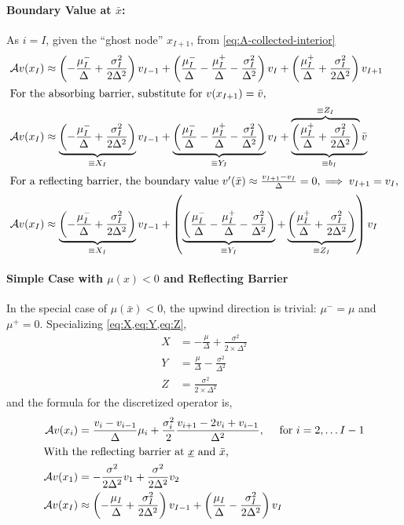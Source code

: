 \documentclass[11pt]{etk-article}
\begin{document}
\paragraph{Boundary Value at $\bar{x}$:}
As $i=I$, given the ``ghost node'' $x_{I+1}$, from \cref{eq:A-collected-interior}
\begin{align}
\mathcal{A} v(x_I)&\approx \left(-\frac{\mu_I^{-}}{\Delta} +\frac{\sigma_I^2}{2\Delta^2}\right)v_{I-1} + \left(\frac{\mu_I^{-}}{\Delta} - \frac{\mu_I^{+}}{\Delta}-\frac{\sigma_I^2}{\Delta^2}\right)v_I + \left(\frac{\mu_I^{+}}{\Delta} + \frac{\sigma_I^2}{2\Delta^2}\right)v_{I+1}\\
\intertext{For the absorbing barrier, substitute for $v(x_{I+1}) = \bar{v}$,}
\mathcal{A} v(x_I)&\approx \underbrace{\left(-\frac{\mu_I^{-}}{\Delta} +\frac{\sigma_I^2}{2\Delta^2}\right)}_{\equiv X_I} v_{I-1} + \underbrace{\left(\frac{\mu_I^{-}}{\Delta} - \frac{\mu_I^{+}}{\Delta}-\frac{\sigma_I^2}{\Delta^2}\right)}_{\equiv Y_I} v_I + \underbrace{\overbrace{\left(\frac{\mu_I^{+}}{\Delta} + \frac{\sigma_I^2}{2\Delta^2}\right)}^{\equiv Z_I}\bar{v}}_{\equiv b_I}\\
\intertext{For a reflecting barrier, the boundary value $v'(\bar{x}) \approx \frac{v_{I+1}-v_I}{\Delta} = 0, \implies v_{I+1} = v_I$,}
\mathcal{A} v(x_I)&\approx \underbrace{\left(-\frac{\mu_I^{-}}{\Delta} +\frac{\sigma_I^2}{2\Delta^2}\right)}_{\equiv X_I} v_{I-1} + \left(\underbrace{\left(\frac{\mu_I^{-}}{\Delta} - \frac{\mu_I^{+}}{\Delta}-\frac{\sigma_I^2}{\Delta^2}\right)}_{\equiv Y_I} + \underbrace{\left(\frac{\mu_I^{+}}{\Delta} + \frac{\sigma_I^2}{2\Delta^2}\right)}_{\equiv Z_I} \right) v_I 
\end{align}
\paragraph{Simple Case with $\mu(x) < 0$ and Reflecting Barrier}
In the special case of $\mu(\bar{x}) < 0$, the upwind direction is trivial: $\mu^{-} = \mu$ and $\mu^{+} = 0$.  Specializing \cref{eq:X,eq:Y,eq:Z},
\begin{align}
	X &= - \frac{\mu}{\Delta} + \frac{\sigma^{2}}{2\times \Delta^{2}}\label{eq:X-backwards} \\
	Y &= \frac{\mu}{\Delta} - \frac{\sigma^{2}}{\Delta^{2}}\label{eq:Y-backwards} \\
	Z &= \frac{\sigma^{2}}{2\times \Delta^{2}}\label{eq:Z-backwards}
\end{align}
and the formula for the discretized operator is,
\begin{align}
	\mathcal{A} v(x_i)  &= \frac{v_i-v_{i-1}}{\Delta}\mu_i + \frac{\sigma_i^2}{2} \frac{v_{i+1} - 2 v_i + v_{i-1}}{\Delta^2},\quad \text{ for } i = 2,\ldots I-1\\
	\intertext{With the reflecting barrier at $\underline{x}$ and $\bar{x}$,}
	\mathcal{A} v(x_1) &= -\frac{\sigma^{2}}{2\Delta^{2}}v_1 + \frac{\sigma^{2}}{2\Delta^{2}} v_2\\
\mathcal{A} v(x_I)&\approx \left(-\frac{\mu_I}{\Delta} +\frac{\sigma_I^2}{2\Delta^2}\right) v_{I-1} + \left(\frac{\mu_I}{\Delta} - \frac{\sigma_I^2}{2\Delta^2}\right) v_I 
\end{align}
\end{document}
